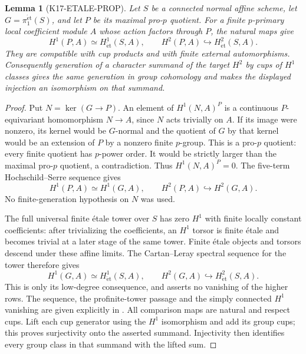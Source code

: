 \documentclass[11pt,a4paper]{article}
\newtheorem{lemma}[theorem]{Lemma}
\theoremstyle{definition}
\begin{document}
\begin{lemma}[K17-ETALE-PROP]\label{lem:etale-prop}
Let $S$ be a connected normal affine scheme, let
$G=\pi_1^{\mathrm{\acute et}}(S)$, and let $P$ be its maximal
pro-$p$ quotient. For a finite $p$-primary local coefficient module
$A$ whose action factors through $P$, the natural maps give
\[
 H^1(P,A)\simeq H^1_{\mathrm{\acute et}}(S,A),\qquad
 H^2(P,A)\hookrightarrow H^2_{\mathrm{\acute et}}(S,A).
\]
They are compatible with cup products and with finite external
automorphisms. Consequently generation of a character summand of
the target $H^2$ by cups of $H^1$ classes gives the same generation
in group cohomology and makes the displayed injection an
isomorphism on that summand.
\end{lemma}

\begin{proof}
Put $N=\ker(G\to P)$. An element of $H^1(N,A)^P$ is a continuous
$P$-equivariant homomorphism $N\to A$, since $N$ acts trivially
on $A$. If its image were nonzero, its kernel would be $G$-normal
and the quotient of $G$ by that kernel would be an extension of
$P$ by a nonzero finite $p$-group. This is a pro-$p$ quotient:
every finite quotient has $p$-power order. It would be strictly
larger than the maximal pro-$p$ quotient, a contradiction.
Thus $H^1(N,A)^P=0$. The five-term Hochschild--Serre sequence gives
\[
 H^1(P,A)\simeq H^1(G,A),\qquad
 H^2(P,A)\hookrightarrow H^2(G,A).
\]
No finite-generation hypothesis on $N$ was used.

The full universal finite \'etale tower over $S$ has zero $H^1$
with finite locally constant coefficients: after trivializing the
coefficients, an $H^1$ torsor is finite \'etale and becomes trivial
at a later stage of the same tower. Finite \'etale objects and
torsors descend under these affine limits. The Cartan--Leray
spectral sequence for the tower therefore gives
\[
 H^1(G,A)\simeq H^1_{\mathrm{\acute et}}(S,A),\qquad
 H^2(G,A)\hookrightarrow H^2_{\mathrm{\acute et}}(S,A).
\]
This is only its low-degree consequence, and asserts no vanishing
of the higher rows. The sequence, the profinite-tower passage and
the simply connected $H^1$ vanishing are given explicitly in
\cite[Theorem~14.9, Remark~14.10, Example~14.11 and
Proposition~14.13, pp.~96--98]{MilneLEC2013}.
All comparison maps are natural and respect cups.
Lift each cup generator using the $H^1$ isomorphism and add its
group cups; this proves surjectivity onto the asserted summand.
Injectivity then identifies every group class in that summand with
the lifted sum.
\end{proof}
\end{document}
